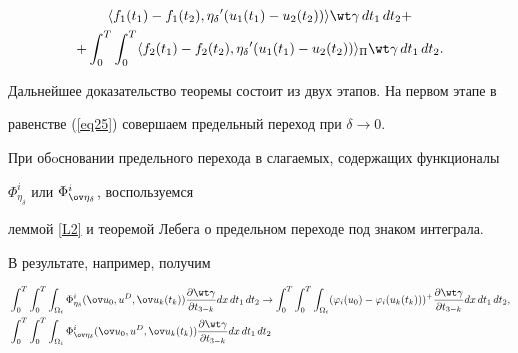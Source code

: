 \begin{pf}
\begin{multline}
\langle f_{1}(t_{1})-f_{1}(t_{2}),{\eta_{\delta}}'


(u_{1}(t_{1})-u_{2}(t_{2})) \rangle 


\wt \gamma\, dt_{1}\, dt_{2}+ \\


%


+\int^{T}_{0} \int^{T}_{0}


\langle f_{2}(t_{1})-f_{2}(t_{2}),{\eta_{\delta}}'


(u_{1}(t_{1})-u_{2}(t_{2})) \rangle_{\Pi} 


\wt \gamma\, dt_{1}\, dt_{2}.


\end{multline}





Дальнейшее доказательство теоремы состоит из двух этапов. На первом этапе в 


равенстве (\ref{eq25}) совершаем предельный переход при $\delta\to 0$. 


При обoсновании предельного перехода в слагаемых, содержащих функционалы


$\Phi^i_{\eta_{\delta}}$ или $\Phi^i_{\ov \eta_{\delta}}$, воспользуемся


леммой \ref{L2} и теоремой Лебега о предельном переходе под знаком интеграла.


В результате, например, получим


\begin{align*}


&\int_{0}^{T} \int_{0}^{T} \int_{\Omega_{i}} 


\Phi_{\eta_{\delta}}^{i}(\ov u_{0}, u^{D}, \ov u_{k}(t_{k})) 


\frac{\partial \wt \gamma}{\partial t_{3-k}} dx\, dt_{1}\, dt_{2}


\rightarrow


\int_{0}^{T} \int_{0}^{T} \int_{\Omega_{i}} 


(\varphi_{i}(u_{0})-\varphi_{i}(u_{k}(t_{k})))^{+} 


\frac{\partial \wt \gamma}{\partial t_{3-k}} dx\, dt_{1}\, dt_{2}, \\


%


&\int_{0}^{T} \int_{0}^{T} \int_{\Omega_{i}} 


\Phi_{\ov \eta_{\delta}}^{i}(\ov u_{0}, u^{D}, \ov u_{k}(t_{k}))


\frac{\partial \wt \gamma}{\partial t_{3-k}} dx\, dt_{1}\, dt_{2}



\end{align*}
\end{pf}
